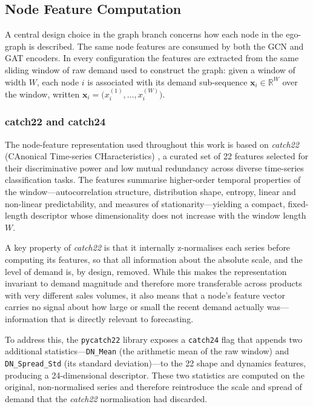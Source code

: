 \subsection{Node Feature Computation}

A central design choice in the graph branch concerns how each node in the
ego-graph is described. The same node features are consumed by both the GCN and
GAT encoders. In every configuration the features are extracted from
the same sliding window of raw demand used to construct the graph: given a
window of width $W$, each node $i$ is associated with its demand
sub-sequence $\mathbf{x}_i \in \mathbb{R}^{W}$ over the window, written
$\mathbf{x}_i = \bigl(x_i^{(1)},\ldots,x_i^{(W)}\bigr)$.

\subsubsection{catch22 and catch24}

The node-feature representation used throughout this work is based on
\textit{catch22} (CAnonical Time-series CHaracteristics)
\cite{Lubba2019}, a curated set of 22
features selected for their discriminative power and low mutual redundancy
across diverse time-series classification tasks.  The features summarise
higher-order temporal properties of the window---autocorrelation structure,
distribution shape, entropy, linear and non-linear predictability, and
measures of stationarity---yielding a compact, fixed-length descriptor whose
dimensionality does not increase with the window length $W$.

A key property of \textit{catch22} is that it internally z-normalises each
series before computing its features, so that all information about the
absolute scale, and the level of demand is, by design, removed.  While this
makes the representation invariant to demand magnitude and therefore more
transferable across products with very different sales volumes, it also means
that a node's feature vector carries no signal about how large or small the
recent demand actually was---information that is directly relevant to
forecasting.

To address this, the \texttt{pycatch22} library exposes a \texttt{catch24}
flag that appends two additional statistics---\texttt{DN\_Mean} (the arithmetic
mean of the raw window) and \texttt{DN\_Spread\_Std} (its standard
deviation)---to the 22 shape and dynamics features, producing a 24-dimensional
descriptor.  These two statistics are computed on the original, non-normalised
series and therefore reintroduce the scale and spread of demand that the
\textit{catch22} normalisation had discarded.

